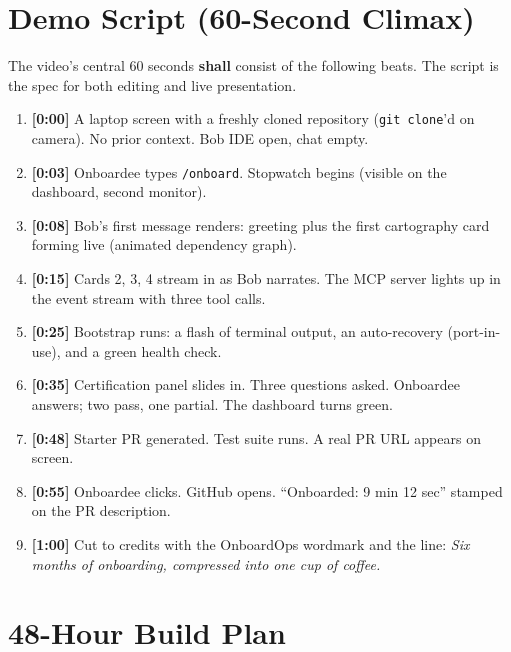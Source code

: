 \documentclass[11pt,letterpaper]{article}
\newcommand{\shall}{\textbf{shall}}
\begin{document}
\section{Demo Script (60-Second Climax)}

The video's central 60 seconds \shall{} consist of the following beats. The script is the spec for both editing and live presentation.

\begin{enumerate}
  \item \textbf{[0:00]} A laptop screen with a freshly cloned repository (\texttt{git clone}'d on camera). No prior context. Bob IDE open, chat empty.
  \item \textbf{[0:03]} Onboardee types \texttt{/onboard}. Stopwatch begins (visible on the dashboard, second monitor).
  \item \textbf{[0:08]} Bob's first message renders: greeting plus the first cartography card forming live (animated dependency graph).
  \item \textbf{[0:15]} Cards 2, 3, 4 stream in as Bob narrates. The MCP server lights up in the event stream with three tool calls.
  \item \textbf{[0:25]} Bootstrap runs: a flash of terminal output, an auto-recovery (port-in-use), and a green health check.
  \item \textbf{[0:35]} Certification panel slides in. Three questions asked. Onboardee answers; two pass, one partial. The dashboard turns green.
  \item \textbf{[0:48]} Starter PR generated. Test suite runs. A real PR URL appears on screen.
  \item \textbf{[0:55]} Onboardee clicks. GitHub opens. ``Onboarded: 9 min 12 sec'' stamped on the PR description.
  \item \textbf{[1:00]} Cut to credits with the OnboardOps wordmark and the line: \textit{Six months of onboarding, compressed into one cup of coffee.}
\end{enumerate}

\section{48-Hour Build Plan}
\end{document}

